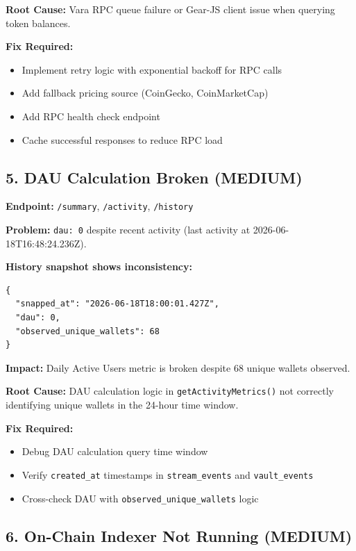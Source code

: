 \documentclass[11pt,a4paper]{article}
\begin{document}
\textbf{Root Cause:} Vara RPC queue failure or Gear-JS client issue when querying token balances.

\textbf{Fix Required:}
\begin{itemize}
    \item Implement retry logic with exponential backoff for RPC calls
    \item Add fallback pricing source (CoinGecko, CoinMarketCap)
    \item Add RPC health check endpoint
    \item Cache successful responses to reduce RPC load
\end{itemize}

\subsection{5. DAU Calculation Broken (MEDIUM)}

\textbf{Endpoint:} \texttt{/summary}, \texttt{/activity}, \texttt{/history}

\textbf{Problem:} \texttt{dau: 0} despite recent activity (last activity at 2026-06-18T16:48:24.236Z).

\textbf{History snapshot shows inconsistency:}
\begin{lstlisting}
{
  "snapped_at": "2026-06-18T18:00:01.427Z",
  "dau": 0,
  "observed_unique_wallets": 68
}
\end{lstlisting}

\textbf{Impact:} Daily Active Users metric is broken despite 68 unique wallets observed.

\textbf{Root Cause:} DAU calculation logic in \texttt{getActivityMetrics()} not correctly identifying unique wallets in the 24-hour time window.

\textbf{Fix Required:}
\begin{itemize}
    \item Debug DAU calculation query time window
    \item Verify \texttt{created\_at} timestamps in \texttt{stream\_events} and \texttt{vault\_events}
    \item Cross-check DAU with \texttt{observed\_unique\_wallets} logic
\end{itemize}

\subsection{6. On-Chain Indexer Not Running (MEDIUM)}
\end{document}
